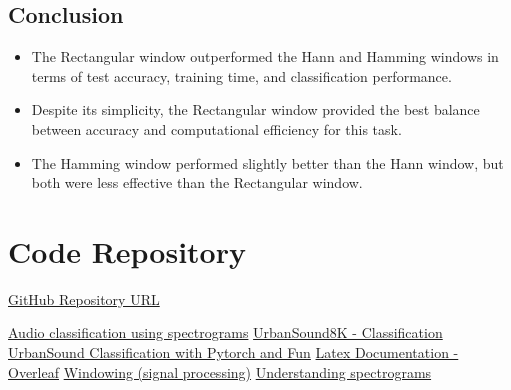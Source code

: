 \documentclass[a4paper,12pt]{article}
\begin{document}
\subsection{Conclusion}
    \begin{itemize}
        \item The Rectangular window outperformed the Hann and Hamming windows in terms of test accuracy, training time, and classification performance.
        \item Despite its simplicity, the Rectangular window provided the best balance between accuracy and computational efficiency for this task.
        \item The Hamming window performed slightly better than the Hann window, but both were less effective than the Rectangular window.
    \end{itemize}
\newpage
\section{Code Repository} 
\href{https://github.com/IITJ-M23CSA521/M23CSA521_PA1.git}{GitHub Repository URL}
%
\begin{thebibliography}{9}
     \href{https://www.geeksforgeeks.org/audio-classification-using-spectrograms/}{Audio classification using spectrograms}
     \href{https://www.kaggle.com/code/prabhavsingh/urbansound8k-classification}{ UrbanSound8K - Classification}
     \href{https://www.kaggle.com/code/adinishad/urbansound-classification-with-pytorch-and-fun}{ UrbanSound Classification with Pytorch and Fun}
      \href{https://www.overleaf.com/}{ Latex Documentation - Overleaf}
      \href{https://www.slideshare.net/slideshow/windowing-signal-processing/83279017}{Windowing (signal processing)}
      \href{https://www.izotope.com/en/learn/understanding-spectrograms.html}{Understanding spectrograms}
\end{thebibliography}
\end{document}
